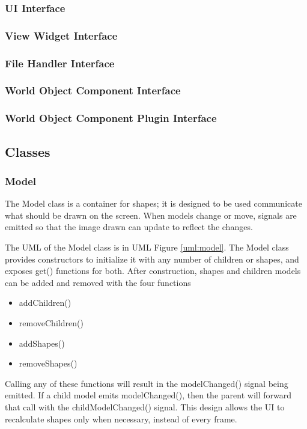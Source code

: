   \subsubsection{UI Interface}
  
  \subsubsection{View Widget Interface}
  
  \subsubsection{File Handler Interface}
  
  \subsubsection{World Object Component Interface}
  
  \subsubsection{World Object Component Plugin Interface}

 \subsection{Classes}
  \subsubsection{Model}
  The Model class is a container for shapes; it is designed to be used communicate what should be drawn on the screen. When models change or move, signals are emitted so that the image drawn can update to reflect the changes.
  
 	The UML of the Model class is in UML Figure \ref{uml:model}. The Model class provides constructors to initialize it with any number of children or shapes, and exposes get() functions for both. After construction, shapes and children models can be added and removed with the four functions
 \begin{itemize}
 	\item addChildren()
 	\item removeChildren()
 	\item addShapes()
 	\item removeShapes()
 \end{itemize}
 Calling any of these functions will result in the modelChanged() signal being emitted. If a child model emits modelChanged(), then the parent will forward that call with the childModelChanged() signal. This design allows the UI to recalculate shapes only when necessary, instead of every frame.
 

